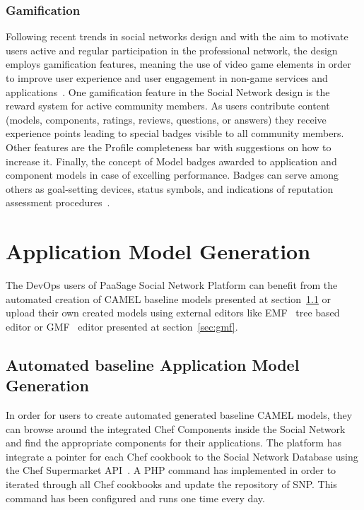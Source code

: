 \subsubsection{Gamification}
Following recent trends in social networks design and with the aim to motivate users active and regular participation in
the professional network, the design employs gamification features, meaning the use of video game elements in order to improve user experience and user engagement in non-game services and applications~\cite{deterding2011gamification}. One gamification feature in the Social Network design is the reward system for active community members. As users contribute content (models, components, ratings, reviews, questions, or answers) they receive experience points leading to special badges visible to all community members. Other features are the Profile completeness bar with suggestions on how to increase it. Finally, the concept of Model badges awarded to application and component models in case of excelling performance. Badges can serve among others as goal-setting devices, status symbols, and indications of reputation assessment procedures~\cite{antin2011badges}.

\section{Application Model Generation}
The DevOps users of PaaSage Social Network Platform can benefit from the automated creation of CAMEL baseline models presented at section~\ref{sec:automatedcreation} or upload their own created models using external editors like EMF~\cite{cdomodel} tree based editor or GMF~\cite{gmf_url} editor presented at section~\ref{sec:gmf}.

\subsection{Automated baseline Application Model Generation}
\label{sec:automatedcreation}
In order for users to create automated generated baseline CAMEL models, they can browse around the integrated Chef Components inside the Social Network and find the appropriate components for their applications. The platform has integrate a pointer for each Chef cookbook to the Social Network Database using the Chef Supermarket API~\cite{chef_api_url}. A PHP command has implemented in order to iterated through all Chef cookbooks and update the repository of SNP. This command has been configured and runs one time every day.

